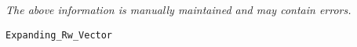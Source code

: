 \label{pkg:expanding\_rw\_vector}

{\tiny \it The above information is manually maintained and may contain errors.}
\begin{verbatim}
Expanding_Rw_Vector
\end{verbatim}
